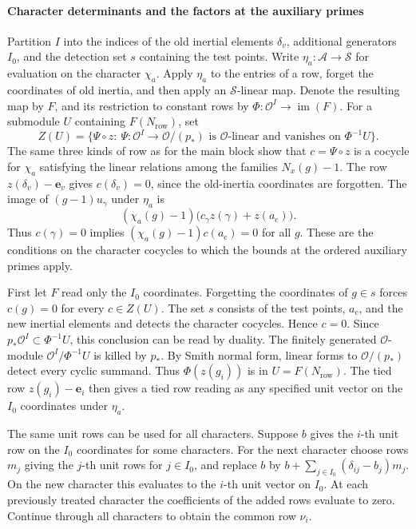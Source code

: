 \paragraph{Character determinants and the factors at the auxiliary primes}
Partition \(I\) into the indices of the old inertial elements \(\delta_v\),
additional generators \(I_0\), and the detection set \(s\) containing
the test points. Write \(\eta_a\colon\mathcal A\to\mathcal S\) for
evaluation on the character \(\chi_a\). Apply \(\eta_a\) to the
entries of a row, forget the coordinates of old inertia, and then
apply an \(\mathcal S\)-linear map. Denote the resulting map by \(F\),
and its restriction to constant rows by
\(\Phi:\mathcal O^I\to\operatorname{im}(F)\).
For a submodule \(U\) containing \(F(N_\mathrm{row})\), set
\[
 Z(U)=\{\Psi\circ z:\ \Psi:\mathcal O^I\to\mathcal O/(p_\ast)
   \text{ is }\mathcal O\text{-linear and vanishes on }\Phi^{-1}U\}.
\]
The same three kinds of row as for the main block show that
\(c=\Psi\circ z\) is a cocycle for \(\chi_a\) satisfying the linear
relations among the families \(N_x(g)-1\).
The row \(z(\delta_v)-\mathbf e_v\) gives \(c(\delta_v)=0\), since
the old-inertia coordinates are forgotten.
The image of \((g-1)u_\gamma\) under \(\eta_a\) is
\[
 (\chi_a(g)-1)\bigl(c_\gamma z(\gamma)+z(a_{\mathrm c})\bigr).
\]
Thus \(c(\gamma)=0\) implies
\((\chi_a(g)-1)c(a_{\mathrm c})=0\) for all \(g\).
These are the conditions on the character cocycles to which the
bounds at the ordered auxiliary primes apply.

First let \(F\) read only the \(I_0\) coordinates. Forgetting the
coordinates of \(g\in s\) forces \(c(g)=0\) for every \(c\in Z(U)\).
The set \(s\) consists of the test points, \(a_{\mathrm c}\), and the
new inertial elements and detects the character cocycles. Hence \(c=0\).
Since \(p_\ast\mathcal O^I\subset\Phi^{-1}U\), this conclusion can be
read by duality. The finitely generated \(\mathcal O\)-module
\(\mathcal O^I/\Phi^{-1}U\) is killed by \(p_\ast\). By Smith normal form,
linear forms to \(\mathcal O/(p_\ast)\) detect every cyclic summand.
Thus \(\Phi(z(g_i))\) is in \(U=F(N_\mathrm{row})\).
The tied row \(z(g_i)-\mathbf e_i\) then gives a tied row reading
as any specified unit vector on the \(I_0\) coordinates under \(\eta_a\).

The same unit rows can be used for all characters. Suppose \(b\)
gives the \(i\)-th unit row on the \(I_0\) coordinates for some
characters. For the next character choose rows \(m_j\) giving the
\(j\)-th unit rows for \(j\in I_0\), and replace \(b\) by
\(b+\sum_{j\in I_0}(\delta_{ij}-b_j)m_j\). On the new character this
evaluates to the \(i\)-th unit vector on \(I_0\). At each previously
treated character the coefficients of the added rows evaluate to
zero. Continue through all characters to obtain the common row \(\nu_i\).

